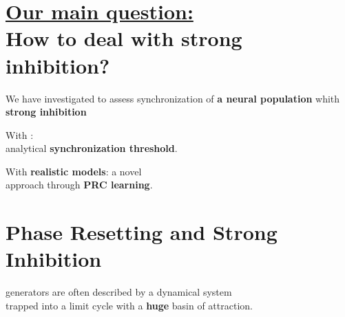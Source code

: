 \section{\underline{Our main question:} \\ How to deal with strong inhibition?}

 We have investigated  to assess synchronization
of {\bf \color{blue} a neural population} whith {\bf \color{red} strong
  inhibition}

\usualsep\usualsep
\begin{center}
	
\end{center}

\usualsep\usualsep
\hspace{1cm}
\begin{minipage}{0.26\textwidth}
  
   With : \\ analytical
  {\color{blue} \bf synchronization threshold}.
  
\end{minipage}
\begin{minipage}{0.2\textwidth}
  \begin{flushright}
     With {\color{Green} \bf realistic models}: a novel \\ approach 
    through {\color{blue} \bf PRC learning}.
  \end{flushright}
\end{minipage}

\usualsep\usualsep


\section{Phase Resetting and Strong Inhibition}

\usualsep
\begin{center}
   generators are often
  described by a {\color{magenta} dynamical system} \\ trapped into a
  {\color{red} limit cycle} with a {\bf \color{Orange} huge} basin of attraction.
\end{center}

